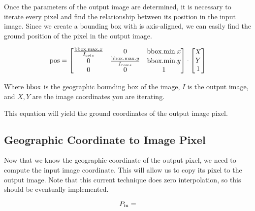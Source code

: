 Once the parameters of the output image are determined, it is necessary to iterate every pixel and find the relationship between its position in the input image. 
Since we create a bounding box with is axis-aligned, we can easily find the ground position of the pixel in the output image. 

\begin{equation}
\textup{pos} = \begin{bmatrix}
\frac{\textup{bbox.max}.x}{I_{cols}} & 0 & \textup{bbox.min}.x\\ 
 0 & \frac{\textup{bbox.max}.y}{I_{rows}} & \textup{bbox.min}.y\\ 
  0 & 0 & 1 
  \end{bmatrix}
  \cdot
  \begin{bmatrix}
  X \\
  Y \\
  1
  \end{bmatrix}
\end{equation}

Where $\textup{bbox}$ is the geographic bounding box of the image, $I$ is the output image, and $X,Y$ are the image coordinates you are iterating. 

This equation will yield the ground coordinates of the output image pixel. 

\subsection*{Geographic Coordinate to Image Pixel}

Now that we know the geographic coordinate of the output pixel, we need to compute the input image coordinate.  This will allow us to copy its pixel to the output image. 
Note that this current technique does zero interpolation, so this should be eventually implemented. 

\begin{equation}
P_{\textup{in}} = 
\end{equation}



